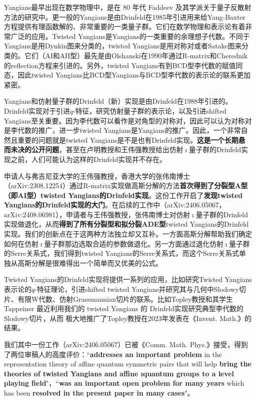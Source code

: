 \documentclass[12pt,UTF8,AutoFakeBold=4,a4paper]{ctexart}
\begin{document}
Yangians最早出现在数学物理中，是在 80 年代 Faddeev 及其学派关于量子反散射方法的研究中。更一般的Yangians是由Drinfeld在1985年引进用来给Yang-Baxter方程提供有理函数解的、非常重要的一类量子群。它们在数学物理和表示论有着非常广泛的应用。Twisted Yangians是Yangians的一类重要的余理想子代数。不同于Yangians是用Dynkin图来分类的，twisted Yangians是用对称对或者Satake图来分类的。它们（AI和AII型）最先是由Olshanski在1990年通过R-matrix和Cherednik的reflection方程来引进的。另外，twisted Yangians有到BCD型李代数的赋值同态，因此twisted Yangians比BCD型Yangians与BCD型李代数的表示论的联系更加紧密。

Yangians和仿射量子群的Drinfeld（新）实现是由Drinfeld在1988年引进的。Drinfeld实现对于引进$q$-特征，研究仿射量子群的表示论，以及引进shifted Yangians至关重要。因为李代数可以看作是对角型的对称对，因此可以认为对称对是李代数的推广，进一步twisted Yangians是Yangians的推广。因此，一个非常自然且重要的问题就是twisted Yangians是不是也有Drinfeld实现。\textbf{这是一个长期悬而未决的公开问题}，甚至在卢明教授和王伟强教授给出仿射$\imath$量子群的Drinfeld实现之前，人们可能认为这样的Drinfeld实现并不存在。

申请人与弗吉尼亚大学的王伟强教授，香港大学的张伟南博士（arXiv:2308.12254）通过R-matrix实现做高斯分解的方法\textbf{首次得到了分裂型A型（即AI型）twisted Yangians的Drinfeld实现}。这份工作开启了\textbf{发现twisted Yangians的Drinfeld实现的大门}。在后续的工作中（arXiv:2406.05067，arXiv:2408.06981），申请者与王伟强教授，张伟南博士对仿射$\imath$量子群的Drinfeld实现做退化，从而\textbf{得到了所有分裂型和拟分裂ADE型}twisted Yangians的Drinfeld实现。我们的创新点在于这两种方法独立却又互补。一方面高斯分解帮助我们确定如何在仿射$\imath$量子群那边选取合适的参数做退化。另一方面通过退化仿射$\imath$量子群的Serre关系式，我们得到twisted Yangians的Serre关系式，而这个Serre关系式单独从高斯分解是很难得出一个简单而又优美的公式。

Twisted Yangians的Drinfeld实现将提供一系列的应用，比如研究Twisted Yangians表示论的$q$-特征理论，引进shifted twisted Yangians并研究其与几何中Slodowy切片、有限W代数、仿射Grassmannian切片的联系。比如Topley教授和其学生Tappeiner 最近利用我们的 twisted Yangians 的 Drinfeld实现研究典型李代数的Slodowy切片，从而 极大地推广了Topley教授在2023年发表在《Invent. Math.》的结果。

我们其中一份工作（arXiv:2406.05067）已被《Comm. Math. Phys.》接受，得到了两位审稿人的高度评价：``\textbf{addresses an important problem} in the representation theory of affine
quantum symmetric pairs that will help \textbf{bring the theories of twisted Yangians and affine ıquantum groups to a level playing field}"，``\textbf{was an important open problem for many years} which has been \textbf{resolved in the present paper in many cases}"。
\end{document}
